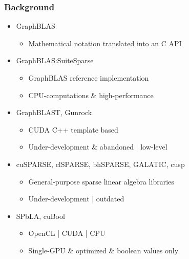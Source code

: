 \documentclass[aspectratio=169,xcolor=table,english]{beamer}
\begin{document}
\begin{frame}[fragile] \frametitle{Background}
    \begin{minipage}[m]{0.7\linewidth}
        \begin{itemize}
        \item GraphBLAS
        {
        \begin{itemize}
            \item Mathematical notation translated into an C API
        \end{itemize}
        }
        \item GraphBLAS:SuiteSparse
        {
        \begin{itemize}
            \item GraphBLAS reference implementation
            \item CPU-computations \& high-performance
        \end{itemize}
        }
        \item GraphBLAST, Gunrock
        {
        \begin{itemize}
            \item CUDA C++ template based
            \item Under-development \& abandoned | low-level
        \end{itemize}
        }
        \item cuSPARSE, clSPARSE, bhSPARSE, GALATIC, cusp
        {
        \begin{itemize}
            \item General-purpose sparse linear algebra libraries
            \item Under-development | outdated
        \end{itemize}
        }
        \item SPbLA, cuBool
        {
        \begin{itemize}
            \item OpenCL | CUDA | CPU
            \item Single-GPU \& optimized \& boolean values only
        \end{itemize}
        }
        \end{itemize}
    \end{minipage}\hfill
    \begin{minipage}[m]{0.3\linewidth}
        \begin{figure}
            \centering

\end{figure}
\end{minipage}
\end{frame}
\end{document}
